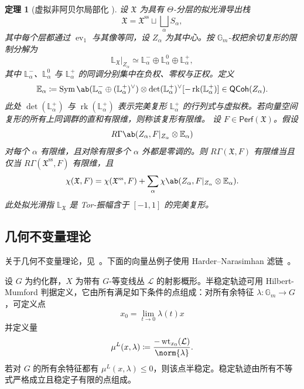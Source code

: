 \documentclass{amsart}
\newtheorem{thm}{定理}[section]
\theoremstyle{definition}
\theoremstyle{remark}
\theoremstyle{plain}
\theoremstyle{definition}
\theoremstyle{remark}
\newcommand{\G}{\mathbb{G}}
\newcommand{\E}{\mathbb{E}}
\renewcommand{\L}{\mathbb{L}}
\newcommand{\mc}[1]{\mathcal{#1}}
\newcommand{\mf}[1]{\mathfrak{#1}}
\newcommand{\mr}[1]{\mathrm{#1}}
\newcommand{\on}[1]{\operatorname{#1}}
\newcommand{\ms}[1]{\mathsf{#1}}
\newcommand{\1}{\mathbf{1}}
\newcommand{\2}{\mathbf{2}}
\newcommand{\3}{\mathbf{3}}
\DeclareMathOperator{\ev}{ev}
\begin{document}
\begin{thm}[虚拟非阿贝尔局部化 {\cite[Theorem~5.1]{HLlocalization}}]
    设 \(\mf{X}\) 为具有 \(\Theta\)-分层的拟光滑导出栈
    \[
        \mf{X}
        =
        \mf{X}^{\mr{ss}}
        \sqcup
        \bigsqcup_\alpha S_\alpha,
    \]
    其中每个层都通过 \(\ev_1\) 与其像等同，设 \(Z_\alpha\) 为其中心。按 \(\G_m\)-权把余切复形的限制分解为
    \[
        \L_{\mf{X}}|_{Z_\alpha}
        \simeq
        \L_\alpha^-
        \oplus
        \L_\alpha^0
        \oplus
        \L_\alpha^+,
    \]
    其中 \(\L_\alpha^-\)、\(\L_\alpha^0\) 与 \(\L_\alpha^+\) 的同调分别集中在负权、零权与正权。定义
    \[
        \E_\alpha
        \coloneqq
        \on{Sym}\ab(
            \L_\alpha^-
            \oplus
            (\L_\alpha^+)^\vee
        )
        \otimes
        \det(\L_\alpha^+)^\vee
        [-\on{rk}(\L_\alpha^+)]
        \in
        \ms{QCoh}(Z_\alpha).
    \]
    此处 \(\det(\L_\alpha^+)\) 与 \(\on{rk}(\L_\alpha^+)\) 表示完美复形 \(\L_\alpha^+\) 的行列式与虚拟秩。若向量空间复形的所有上同调群的直和有限维，则称该复形有限维。
    设 \(F\in\ms{Perf}(\mf{X})\)。假设
    \[
        R\Gamma\ab(
            Z_\alpha,
            F|_{Z_\alpha}\otimes\E_\alpha
        )
    \]
    对每个 \(\alpha\) 有限维，且对除有限多个 \(\alpha\) 外都是零调的。则 \(R\Gamma(\mf{X},F)\) 有限维当且仅当 \(R\Gamma(\mf{X}^{\mr{ss}},F)\) 有限维，且
    \[
        \chi(\mf{X},F)
        =
        \chi(\mf{X}^{\mr{ss}},F)
        +
        \sum_\alpha
        \chi\ab(
            Z_\alpha,
            F|_{Z_\alpha}\otimes\E_\alpha
        ).
    \]
    此处拟光滑指 \(\L_{\mf{X}}\) 是 Tor-振幅含于 \([-1,1]\) 的完美复形。
\end{thm}


\subsection{几何不变量理论}%
\label{sub:Geometric invariant theory}

关于几何不变量理论，见~\cite{MFK1994}。下面的向量丛例子使用 Harder--Narasimhan 滤链~\cite{HN1975}。

设 \(G\) 为约化群，\(X\) 为带有 \(G\)-等变线丛 \(\mc{L}\) 的射影概形。半稳定轨迹可用 Hilbert-Mumford 判据定义，它由所有满足如下条件的点组成：对所有余特征
\(\lambda \colon \G_m \to G\)，可定义点
\[ x_0 = \lim_{t \to 0} \lambda(t) x \]
并定义量
\[ \mu^L(x, \lambda) \coloneqq \frac{-\on{wt}_{x_0}(\mc{L})}{\norm{\lambda}}. \]
若对 \(G\) 的所有余特征都有 \(\mu^L(x, \lambda) \leq 0\)，则该点半稳定。稳定轨迹由所有不等式严格成立且稳定子有限的点组成。
\end{document}
